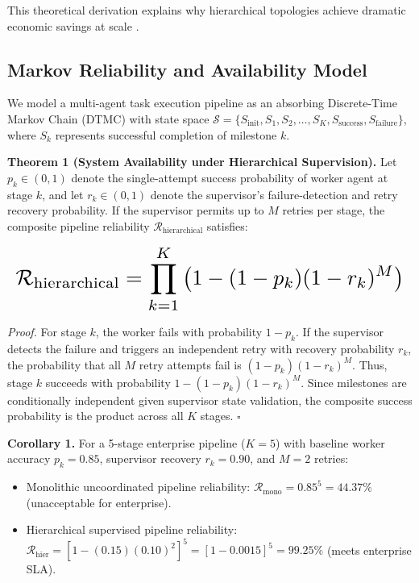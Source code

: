 \documentclass[10pt,twocolumn,letterpaper]{article}
\begin{document}
This theoretical derivation explains why hierarchical topologies achieve dramatic economic savings at scale \cite{arxiv_2501_02497}.




\subsection{Markov Reliability and Availability Model}


We model a multi-agent task execution pipeline as an absorbing Discrete-Time Markov Chain (DTMC) with state space $\mathcal{S} = \{S_{\text{init}}, S_1, S_2, \ldots, S_K, S_{\text{success}}, S_{\text{failure}}\}$, where $S_k$ represents successful completion of milestone $k$.

\textbf{Theorem 1 (System Availability under Hierarchical Supervision).} Let $p_k \in (0, 1)$ denote the single-attempt success probability of worker agent at stage $k$, and let $r_k \in (0, 1)$ denote the supervisor's failure-detection and retry recovery probability. If the supervisor permits up to $M$ retries per stage, the composite pipeline reliability $\mathcal{R}_{\text{hierarchical}}$ satisfies:












\begin{equation}
\resizebox{\columnwidth}{!}{$\displaystyle
\begin{aligned}
\mathcal{R}_{\text{hierarchical}} = \prod_{k=1}^K \left( 1 - (1 - p_k)(1 - r_k)^M \right)
\end{aligned}
$}
\end{equation}












\textit{Proof.} For stage $k$, the worker fails with probability $1 - p_k$. If the supervisor detects the failure and triggers an independent retry with recovery probability $r_k$, the probability that all $M$ retry attempts fail is $(1 - p_k)(1 - r_k)^M$. Thus, stage $k$ succeeds with probability $1 - (1 - p_k)(1 - r_k)^M$. Since milestones are conditionally independent given supervisor state validation, the composite success probability is the product across all $K$ stages. $\square$

\textbf{Corollary 1.} For a 5-stage enterprise pipeline ($K = 5$) with baseline worker accuracy $p_k = 0.85$, supervisor recovery $r_k = 0.90$, and $M = 2$ retries:
\begin{itemize}
  \item Monolithic uncoordinated pipeline reliability: $\mathcal{R}_{\text{mono}} = 0.85^5 = 44.37\%$ (unacceptable for enterprise).
  \item Hierarchical supervised pipeline reliability: $\mathcal{R}_{\text{hier}} = [1 - (0.15)(0.10)^2]^5 = [1 - 0.0015]^5 = 99.25\%$ (meets enterprise SLA).
\end{itemize}
\end{document}

